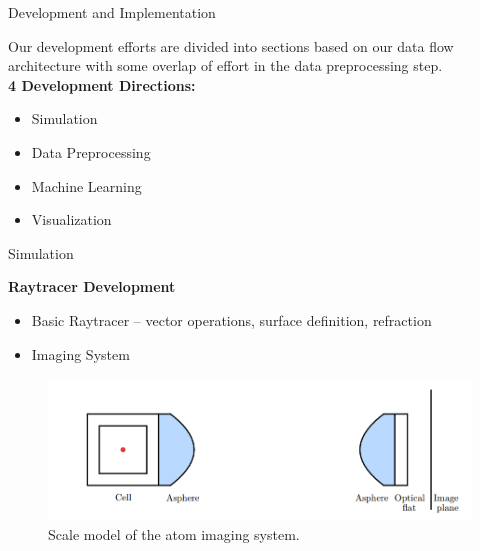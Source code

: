 \documentclass{beamer}
\begin{document}
\begin{frame}{Development and Implementation}

Our development efforts are divided into sections based on our data flow architecture with some overlap of effort in the data preprocessing step.\\

\vspace{.3cm}
\textbf{4 Development Directions:}
\begin{itemize}
\item Simulation
\item Data Preprocessing
\item Machine Learning
\item Visualization
\end{itemize}

\end{frame}

\begin{frame}{Simulation}

\textbf{Raytracer Development}
\begin{itemize}
\item Basic Raytracer -- vector operations, surface definition, refraction
\item Imaging System
\end{itemize}

\begin{figure}
\includegraphics[scale=0.3]{asphere.png}
\caption{Scale model of the atom imaging system.}
\end{figure}

\end{frame}
\end{document}
